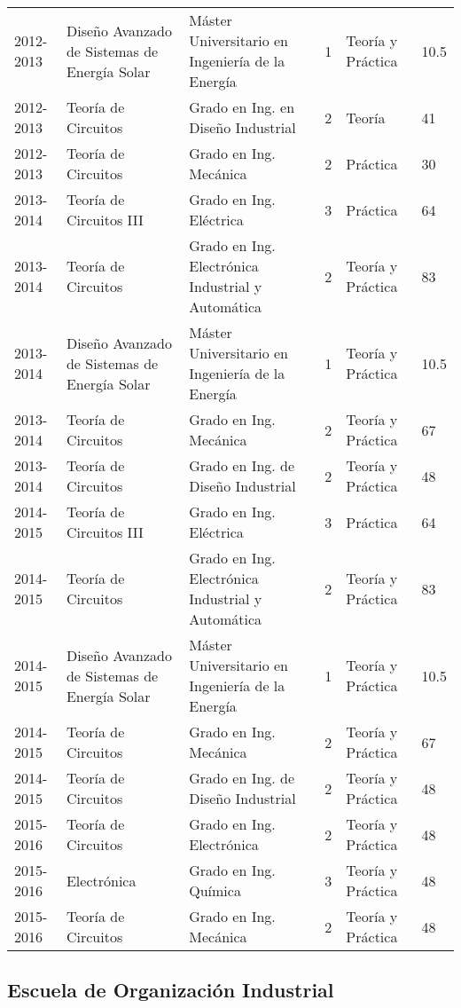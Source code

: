 \documentclass[article, a4paper]{memoir}
\begin{document}
\begin{center}
\begin{tabular}{p{18mm}p{45mm}p{40mm}p{10mm}p{15mm}p{10mm}}
2012-2013 & Diseño Avanzado de Sistemas de Energía Solar & Máster Universitario en Ingeniería de la Energía & 1 & Teoría y Práctica & 10.5\\
2012-2013 & Teoría de Circuitos & Grado en Ing. en Diseño Industrial & 2 & Teoría & 41\\
2012-2013 & Teoría de Circuitos & Grado en Ing. Mecánica & 2 & Práctica & 30\\
\hline
2013-2014 & Teoría de Circuitos III & Grado en Ing. Eléctrica & 3 & Práctica & 64\\
2013-2014 & Teoría de Circuitos & Grado en Ing. Electrónica Industrial y Automática & 2 & Teoría y Práctica & 83\\
2013-2014 & Diseño Avanzado de Sistemas de Energía Solar & Máster Universitario en Ingeniería de la Energía & 1 & Teoría y Práctica & 10.5\\
2013-2014 & Teoría de Circuitos & Grado en Ing. Mecánica & 2 & Teoría y Práctica & 67\\
2013-2014 & Teoría de Circuitos & Grado en Ing. de Diseño Industrial & 2 & Teoría y Práctica & 48\\
\hline
2014-2015 & Teoría de Circuitos III & Grado en Ing. Eléctrica & 3 & Práctica & 64\\
2014-2015 & Teoría de Circuitos & Grado en Ing. Electrónica Industrial y Automática & 2 & Teoría y Práctica & 83\\
2014-2015 & Diseño Avanzado de Sistemas de Energía Solar & Máster Universitario en Ingeniería de la Energía & 1 & Teoría y Práctica & 10.5\\
2014-2015 & Teoría de Circuitos & Grado en Ing. Mecánica & 2 & Teoría y Práctica & 67\\
2014-2015 & Teoría de Circuitos & Grado en Ing. de Diseño Industrial & 2 & Teoría y Práctica & 48\\
\hline
2015-2016 & Teoría de Circuitos & Grado en Ing. Electrónica & 2 & Teoría y Práctica & 48\\
2015-2016 & Electrónica & Grado en Ing. Química & 3 & Teoría y Práctica & 48\\
2015-2016 & Teoría de Circuitos & Grado en Ing. Mecánica & 2 & Teoría y Práctica & 48\\
\hline
\end{tabular}
\end{center}





\subsection{Escuela de Organización Industrial}
\label{sec:org103900e}
\end{document}
